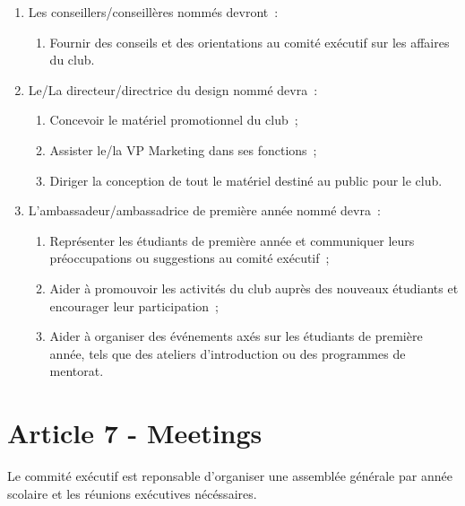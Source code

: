 \begin{enumerate}
    \item Les conseillers/conseillères nommés devront~:
    \begin{enumerate}
        \item Fournir des conseils et des orientations au comité exécutif sur les affaires du club.
    \end{enumerate}
    \item Le/La directeur/directrice du design nommé devra~:
    \begin{enumerate}
        \item Concevoir le matériel promotionnel du club~;
        \item Assister le/la VP Marketing dans ses fonctions~;
        \item Diriger la conception de tout le matériel destiné au public pour le club.
    \end{enumerate}
    \item L'ambassadeur/ambassadrice de première année nommé devra~:
    \begin{enumerate}
        \item Représenter les étudiants de première année et communiquer leurs préoccupations ou suggestions au comité exécutif~;
        \item Aider à promouvoir les activités du club auprès des nouveaux étudiants et encourager leur participation~;
        \item Aider à organiser des événements axés sur les étudiants de première année, tels que des ateliers d'introduction ou des programmes de mentorat.
    \end{enumerate}
\end{enumerate}


\section*{Article 7 - Meetings}

Le commité exécutif est reponsable d'organiser une assemblée générale par année scolaire et les réunions exécutives nécéssaires.

